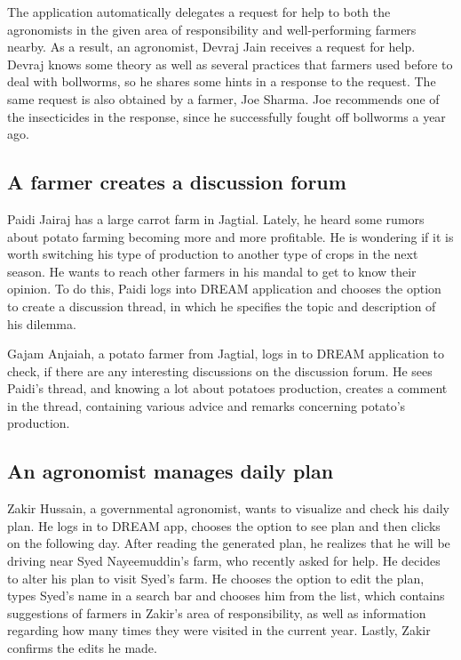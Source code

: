 The application automatically delegates a request for help to both the agronomists in the given area of responsibility and well-performing farmers nearby. As a result, an agronomist, Devraj Jain receives a request for help. Devraj knows some theory as well as several practices that farmers used before to deal with bollworms, so he shares some hints in a response to the request. The same request is also obtained by a farmer, Joe Sharma. Joe recommends one of the insecticides in the response, since he successfully fought off bollworms a year ago.

\subsection*{A farmer creates a discussion forum}
Paidi Jairaj has a large carrot farm in Jagtial. Lately, he heard some rumors about potato farming becoming more and more profitable. He is wondering if it is worth switching his type of production to another type of crops in the next season. He wants to reach other farmers in his mandal to get to know their opinion. To do this, Paidi logs into DREAM application and chooses the option to create a discussion thread, in which he specifies the topic and description of his dilemma.

Gajam Anjaiah, a potato farmer from Jagtial, logs in to DREAM application to check, if there are any interesting discussions on the discussion forum. He sees Paidi's thread, and knowing a lot about potatoes production, creates a comment in the thread, containing various advice and remarks concerning potato's production.

\subsection*{An agronomist manages daily plan}
Zakir Hussain, a governmental agronomist, wants to visualize and check his daily plan. He logs in to DREAM app, chooses the option to see plan and then clicks on the following day. After reading the generated plan, he realizes that he will be driving near Syed Nayeemuddin's farm, who recently asked for help. He decides to alter his plan to visit Syed's farm. He chooses the option to edit the plan, types Syed's name in a search bar and chooses him from the list, which contains suggestions of farmers in Zakir's area of responsibility, as well as information regarding how many times they were visited in the current year. Lastly, Zakir confirms the edits he made.

